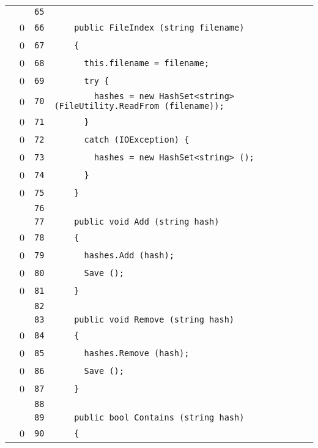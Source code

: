 \documentclass[a4paper,10pt]{article}
\begin{document}
\begin{longtable}[l]{lrrl}
\cellcolor{gray} &  & \verb~65~ & \verb~~\\
\cellcolor{red} & 0 & \verb~66~ & \verb~    public FileIndex (string filename)~\\
\cellcolor{red} & 0 & \verb~67~ & \verb~    {~\\
\cellcolor{red} & 0 & \verb~68~ & \verb~      this.filename = filename;~\\
\cellcolor{red} & 0 & \verb~69~ & \verb~      try {~\\
\cellcolor{red} & 0 & \verb~70~ & \verb~        hashes = new HashSet<string> (FileUtility.ReadFrom (filename));~\\
\cellcolor{red} & 0 & \verb~71~ & \verb~      }~\\
\cellcolor{red} & 0 & \verb~72~ & \verb~      catch (IOException) {~\\
\cellcolor{red} & 0 & \verb~73~ & \verb~        hashes = new HashSet<string> ();~\\
\cellcolor{red} & 0 & \verb~74~ & \verb~      }~\\
\cellcolor{red} & 0 & \verb~75~ & \verb~    }~\\
\cellcolor{gray} &  & \verb~76~ & \verb~~\\
\cellcolor{gray} &  & \verb~77~ & \verb~    public void Add (string hash)~\\
\cellcolor{red} & 0 & \verb~78~ & \verb~    {~\\
\cellcolor{red} & 0 & \verb~79~ & \verb~      hashes.Add (hash);~\\
\cellcolor{red} & 0 & \verb~80~ & \verb~      Save ();~\\
\cellcolor{red} & 0 & \verb~81~ & \verb~    }~\\
\cellcolor{gray} &  & \verb~82~ & \verb~~\\
\cellcolor{gray} &  & \verb~83~ & \verb~    public void Remove (string hash)~\\
\cellcolor{red} & 0 & \verb~84~ & \verb~    {~\\
\cellcolor{red} & 0 & \verb~85~ & \verb~      hashes.Remove (hash);~\\
\cellcolor{red} & 0 & \verb~86~ & \verb~      Save ();~\\
\cellcolor{red} & 0 & \verb~87~ & \verb~    }~\\
\cellcolor{gray} &  & \verb~88~ & \verb~~\\
\cellcolor{gray} &  & \verb~89~ & \verb~    public bool Contains (string hash)~\\
\cellcolor{red} & 0 & \verb~90~ & \verb~    {~\\

\end{longtable}
\end{document}
